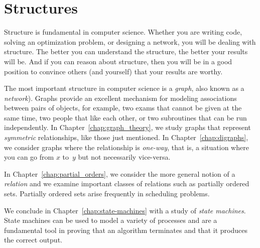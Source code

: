 \part{Structures}
\label{part:structures}

Structure is fundamental in computer science.  Whether you are writing
code, solving an optimization problem, or designing a network, you
will be dealing with structure.  The better you can understand the
structure, the better your results will be.  And if you can reason
about structure, then you will be in a good position to convince
others (and yourself) that your results are worthy.

The most important structure in computer science is a \emph{graph},
also known as a \emph{network}).  Graphs provide an excellent
mechanism for modeling associations between pairs of objects, for
example, two exams that cannot be given at the same time, two people
that like each other, or two subroutines that can be run
independently.  In Chapter~\ref{chap:graph_theory}, we study graphs
that represent \emph{symmetric} relationships, like those just
mentioned.  In Chapter~\ref{chap:digraphs}, we consider graphs where
the relationship is \emph{one-way}, that is, a situation where you can
go from $x$ to~$y$ but not necessarily vice-versa.

In Chapter~\ref{chap:partial_orders}, we consider the more general
notion of a \emph{relation} and we examine important classes of
relations such as partially ordered sets.  Partially ordered sets
arise frequently in scheduling problems.

We conclude in Chapter~\ref{chap:state-machines} with a study of
\emph{state machines}.  State machines can be used to model a variety
of processes and are a fundamental tool in proving that an algorithm
terminates and that it produces the correct output.

\endinput
